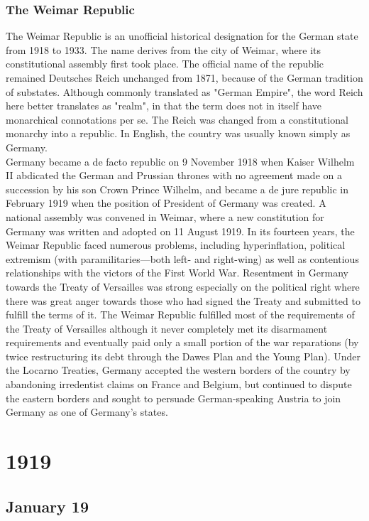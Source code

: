 \documentclass[11pt]{report}
\begin{document}
\subsection{The Weimar Republic}
The Weimar Republic is an unofficial historical designation for the German state from 1918 to 1933. The name derives from the city of Weimar, where its constitutional assembly first took place. The official name of the republic remained Deutsches Reich unchanged from 1871, because of the German tradition of substates. Although commonly translated as "German Empire", the word Reich here better translates as "realm", in that the term does not in itself have monarchical connotations per se. The Reich was changed from a constitutional monarchy into a republic. In English, the country was usually known simply as Germany.\\ \indent Germany became a de facto republic on 9 November 1918 when Kaiser Wilhelm II abdicated the German and Prussian thrones with no agreement made on a succession by his son Crown Prince Wilhelm, and became a de jure republic in February 1919 when the position of President of Germany was created. A national assembly was convened in Weimar, where a new constitution for Germany was written and adopted on 11 August 1919. In its fourteen years, the Weimar Republic faced numerous problems, including hyperinflation, political extremism (with paramilitaries—both left- and right-wing) as well as contentious relationships with the victors of the First World War. Resentment in Germany towards the Treaty of Versailles was strong especially on the political right where there was great anger towards those who had signed the Treaty and submitted to fulfill the terms of it. The Weimar Republic fulfilled most of the requirements of the Treaty of Versailles although it never completely met its disarmament requirements and eventually paid only a small portion of the war reparations (by twice restructuring its debt through the Dawes Plan and the Young Plan). Under the Locarno Treaties, Germany accepted the western borders of the country by abandoning irredentist claims on France and Belgium, but continued to dispute the eastern borders and sought to persuade German-speaking Austria to join Germany as one of Germany's states.

\chapter{1919}
\section{January 19}
\end{document}

